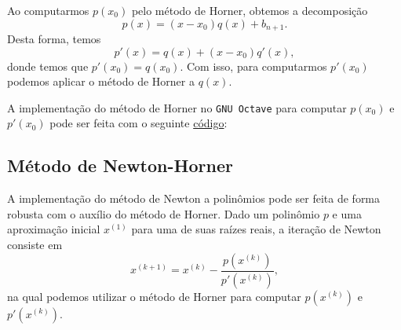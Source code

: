 \begin{obs}\label{obs:Horner_polider}
  Ao computarmos $p(x_0)$ pelo método de Horner, obtemos a decomposição
  \begin{equation}
    p(x) = (x-x_0)q(x) + b_{n+1}.
  \end{equation}
Desta forma, temos
\begin{equation}
  p'(x) = q(x) + (x-x_0)q'(x),
\end{equation}
donde temos que $p'(x_0) = q(x_0)$. Com isso, para computarmos $p'(x_0)$ podemos aplicar o método de Horner a $q(x)$.

\ifisoctave
A implementação do método de Horner no \verb+GNU Octave+ para computar $p(x_0)$ e $p'(x_0)$ pode ser feita com o seguinte \href{https://github.com/phkonzen/notas/blob/master/src/MatematicaNumerica/cap_eq1d/dados/obs_Horner_fun/Horner.m}{código}:

\fi
\end{obs}

\subsection{Método de Newton-Horner}

A implementação do método de Newton a polinômios pode ser feita de forma robusta com o auxílio do método de Horner. Dado um polinômio $p$ e uma aproximação inicial $x^{(1)}$ para uma de suas raízes reais, a iteração de Newton consiste em
\begin{equation}
  x^{(k+1)} = x^{(k)} - \frac{p(x^{(k)})}{p'(x^{(k)})},
\end{equation}
na qual podemos utilizar o método de Horner para computar $p(x^{(k)})$ e $p'(x^{(k)})$.

